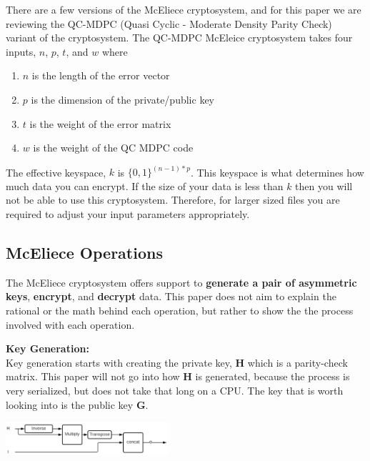 \documentclass[conference]{IEEEtran}
\begin{document}
    
        There are a few versions of the McEliece cryptosystem, and for this paper we are reviewing the QC-MDPC (Quasi Cyclic - Moderate Density Parity Check) variant of the cryptosystem. The QC-MDPC McEleice cryptosystem takes four inputs, $n$, $p$, $t$, and $w$ where
    
        \begin{enumerate}
            \item $n$ is the length of the error vector
            \item $p$ is the dimension of the private/public key
            \item $t$ is the weight of the error matrix
            \item $w$ is the weight of the QC MDPC code
        \end{enumerate}
        
        The effective keyspace, $k$ is $\{0,1\}^{(n-1)*p}$. This keyspace is what determines how much data you can encrypt. If the size of your data is less than $k$ then you will not be able to use this cryptosystem. Therefore, for larger sized files you are required to adjust your input parameters appropriately.
    \subsection{McEliece Operations}\label{McEliece Operations}
        The McEliece cryptosystem offers support to \textbf{generate a pair of asymmetric keys}, \textbf{encrypt}, and \textbf{decrypt} data. This paper does not aim to explain the rational or the math behind each operation, but rather to show the the process involved with each operation.
    
        \textbf{Key Generation:}\label{Key Generation} \\
            Key generation starts with creating the private key, \textbf{H} which is a parity-check matrix. This paper will not go into how \textbf{H} is generated, because the process is very serialized, but does not take that long on a CPU. The key that is worth looking into is the public key \textbf{G}.
            
            \begin{center}
                \includegraphics[width=0.45\textwidth]{Keygen.png}
                \label{fig:keygen}
            \end{center}          
            
\end{document}
